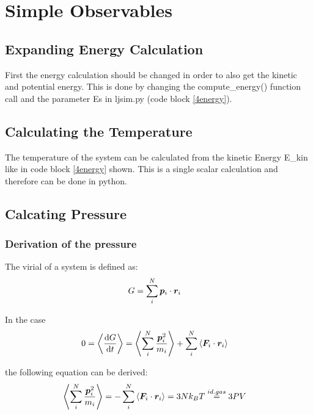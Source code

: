 \section{Simple Observables}

\subsection{Expanding Energy Calculation}

First the energy calculation should be changed in order to also get the kinetic and potential energy.
This is done by changing the compute\_energy() function call and the parameter Es in ljsim.py (code block \ref{4energy}).


\subsection{Calculating the Temperature}

The temperature of the system can be calculated from the kinetic Energy E\_kin like in code block \ref{4energy} shown. This is a single scalar calculation and therefore can be done in python.

\subsection{Calcating Pressure}

\subsubsection*{Derivation of the pressure}

The virial of a system is defined as:
\begin{align}
G
	&=\sum_i^N\boldsymbol{p}_i\cdot\boldsymbol{r}_i
	\label{4p1}
\end{align}

In the case
\begin{align}
0
	&=\left\langle\frac{\text{d} G}{\text{d} t}\right\rangle 
	=\left\langle\sum_i^N\frac{\boldsymbol{p}_i^2}{m_i}\right\rangle+\sum_i^N\left\langle\boldsymbol{F}_i\cdot\boldsymbol{r}_i\right\rangle
	\label{4p2}
\end{align}

the following equation can be derived:
\begin{align}
\left\langle\sum_i^N\frac{\boldsymbol{p}_i^2}{m_i}\right\rangle
	&=-\sum_i^N\left\langle\boldsymbol{F}_i\cdot\boldsymbol{r}_i\right\rangle
	=3Nk_BT
	\stackrel{id.gas}{=}3PV
	\label{4p3}
\end{align}

